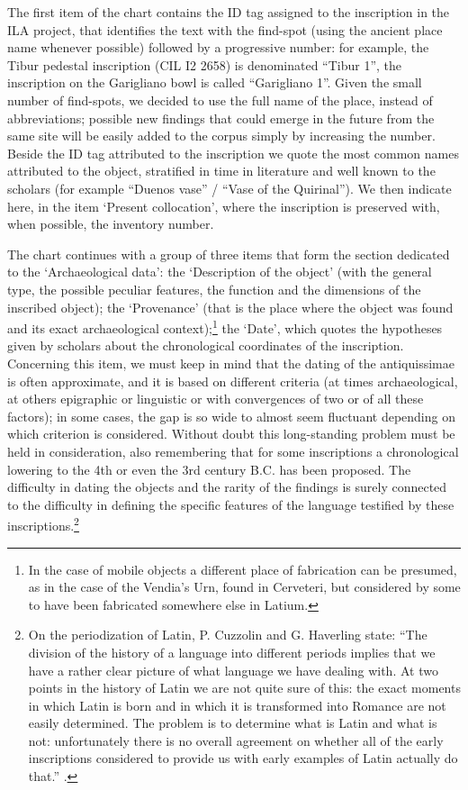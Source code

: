 \documentclass[amsthm,ebook]{saparticle}
\begin{document}
The first item of the chart contains the ID tag assigned to the inscription in the ILA project, that identifies the text
with the find-spot (using the ancient place name whenever possible) followed by a progressive number: for example, the
Tibur pedestal inscription (CIL I2 2658) is denominated “Tibur 1”, the inscription on the Garigliano bowl is called
“Garigliano 1”. Given the small number of find-spots, we decided to use the full name of the place, instead of
abbreviations; possible new findings that could emerge in the future from the same site will be easily added to the
corpus simply by increasing the number. Beside the ID tag attributed to the inscription we quote the most common names
attributed to the object, stratified in time in literature and well known to the scholars (for example “Duenos vase” /
“Vase of the Quirinal”). We then indicate here, in the item `Present collocation', where the inscription is
preserved with, when possible, the inventory number.

The chart continues with a group of three items that form the section dedicated to the `Archaeological data': the
‘Description of the object' (with the general type, the possible peculiar features, the function and the dimensions of
the inscribed object); the ‘Provenance' (that is the place where the object was found and its exact archaeological
context);\footnote{In the case of mobile objects a different place of fabrication can be presumed, as in the case of the
Vendia's Urn, found in Cerveteri, but considered by some to have been fabricated somewhere else in Latium.} the
‘Date', which quotes the hypotheses given by scholars about the chronological coordinates of the inscription.
Concerning this item, we must keep in mind that the dating of the antiquissimae is often approximate, and it is based
on different criteria (at times archaeological, at others epigraphic or linguistic or with convergences of two or of
all these factors); in some cases, the gap is so wide to almost seem fluctuant depending on which criterion is
considered. Without doubt this long-standing problem must be held in consideration, also remembering that for some
inscriptions a chronological lowering to the 4th or even the 3rd century B.C. has been proposed. The difficulty in
dating the objects and the rarity of the findings is surely connected to the difficulty in defining the specific
features of the language testified by these inscriptions.\footnote{On the periodization of Latin, P. Cuzzolin and G.
Haverling state: “The division of the history of a language into different periods implies that we have a rather clear
picture of what language we have dealing with. At two points in the history of Latin we are not quite sure of this: the
exact moments in which Latin is born and in which it is transformed into Romance are not easily determined. The problem
is to determine what is Latin and what is not: unfortunately there is no overall agreement on whether all of the early
inscriptions considered to provide us with early examples of Latin actually do that.” \citep[20]{cuzzolin_syntax_2009}.}
\end{document}
